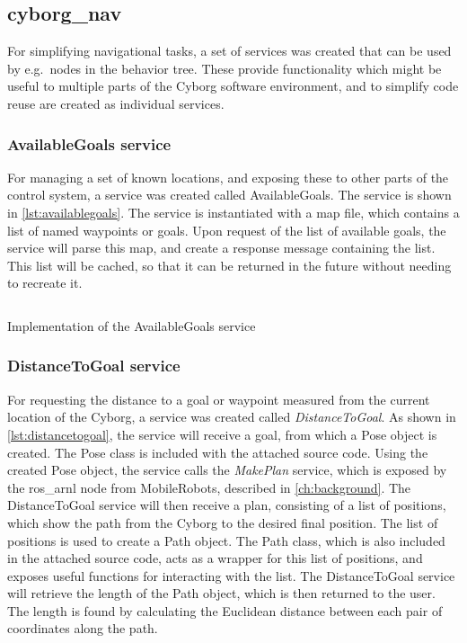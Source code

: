 \documentclass[\rootfolder/main.tex]{subfiles}
\begin{document}
\subsection{cyborg\_nav}

For simplifying navigational tasks, a set of services was created that can be used by e.g.\ nodes in the behavior tree.
These provide functionality which might be useful to multiple parts of the Cyborg software environment, and to simplify code reuse are created as individual services.

\subsubsection{AvailableGoals service}

For managing a set of known locations, and exposing these to other parts of the control system, a service was created called AvailableGoals.
The service is shown in \cref{lst:availablegoals}.
The service is instantiated with a map file, which contains a list of named waypoints or goals.
Upon request of the list of available goals, the service will parse this map, and create a response message containing the list.
This list will be cached, so that it can be returned in the future without needing to recreate it.

\begin{listing}
    \inputminted[fontsize=\scriptsize]{python}{\rootfolder/Chapters/Chapter6/Listings/available_goals.py}
    \caption{Implementation of the AvailableGoals service \label{lst:availablegoals}}
\end{listing}

\subsubsection{DistanceToGoal service}

For requesting the distance to a goal or waypoint measured from the current location of the Cyborg, a service was created called \emph{DistanceToGoal}.
As shown in \cref{lst:distancetogoal}, the service will receive a goal, from which a Pose object is created.
The Pose class is included with the attached source code.
Using the created Pose object, the service calls the \emph{MakePlan} service, which is exposed by the ros\_arnl node from MobileRobots, described in \cref{ch:background}.
The DistanceToGoal service will then receive a plan, consisting of a list of positions, which show the path from the Cyborg to the desired final position.
The list of positions is used to create a Path object.
The Path class, which is also included in the attached source code, acts as a wrapper for this list of positions, and exposes useful functions for interacting with the list.
The DistanceToGoal service will retrieve the length of the Path object, which is then returned to the user.
The length is found by calculating the Euclidean distance between each pair of coordinates along the path.
\end{document}
